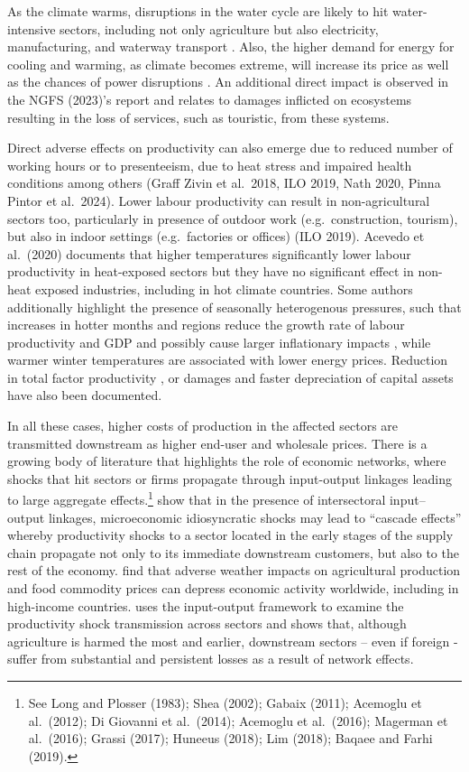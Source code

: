 \documentclass[
  letterpaper,
  DIV=11,
  numbers=noendperiod]{scrartcl}
\begin{document}
As the climate warms, disruptions in the water cycle are likely to hit
water-intensive sectors, including not only agriculture but also
electricity, manufacturing, and waterway transport \citep{buelens2024}.
Also, the higher demand for energy for cooling and warming, as climate
becomes extreme, will increase its price as well as the chances of power
disruptions \citep{mukherjee2021}. An additional direct impact is
observed in the NGFS (2023)'s report and relates to damages inflicted on
ecosystems resulting in the loss of services, such as touristic, from
these systems.

Direct adverse effects on productivity can also emerge due to reduced
number of working hours or to presenteeism, due to heat stress and
impaired health conditions among others (Graff Zivin et al.~2018, ILO
2019, Nath 2020, Pinna Pintor et al.~2024). Lower labour productivity
can result in non-agricultural sectors too, particularly in presence of
outdoor work (e.g.~construction, tourism), but also in indoor settings
(e.g.~factories or offices) (ILO 2019). Acevedo et al.~(2020) documents
that higher temperatures significantly lower labour productivity in
heat-exposed sectors but they have no significant effect in non-heat
exposed industries, including in hot climate countries. Some authors
additionally highlight the presence of seasonally heterogenous
pressures, such that increases in hotter months and regions reduce the
growth rate of labour productivity and GDP \citep{colacito2019} and
possibly cause larger inflationary impacts \citep{kotz2024}, while
warmer winter temperatures are associated with lower energy prices.
Reduction in total factor productivity \citep{letta2019}, or damages and
faster depreciation of capital assets \citep{bakkensen2018} have also
been documented.

In all these cases, higher costs of production in the affected sectors
are transmitted downstream as higher end-user and wholesale prices.
There is a growing body of literature that highlights the role of
economic networks, where shocks that hit sectors or firms propagate
through input-output linkages leading to large aggregate
effects.\footnote{See Long and Plosser (1983); Shea (2002); Gabaix
  (2011); Acemoglu et al.~(2012); Di Giovanni et al.~(2014); Acemoglu et
  al.~(2016); Magerman et al.~(2016); Grassi (2017); Huneeus (2018); Lim
  (2018); Baqaee and Farhi (2019).} \citet{acemoglu2012} show that in
the presence of intersectoral input--output linkages, microeconomic
idiosyncratic shocks may lead to ``cascade effects'' whereby
productivity shocks to a sector located in the early stages of the
supply chain propagate not only to its immediate downstream customers,
but also to the rest of the economy. \citet{dewinne2018} find that
adverse weather impacts on agricultural production and food commodity
prices can depress economic activity worldwide, including in high-income
countries. \citet{zappala2024} uses the input-output framework to
examine the productivity shock transmission across sectors and shows
that, although agriculture is harmed the most and earlier, downstream
sectors -- even if foreign - suffer from substantial and persistent
losses as a result of network effects.
\end{document}
